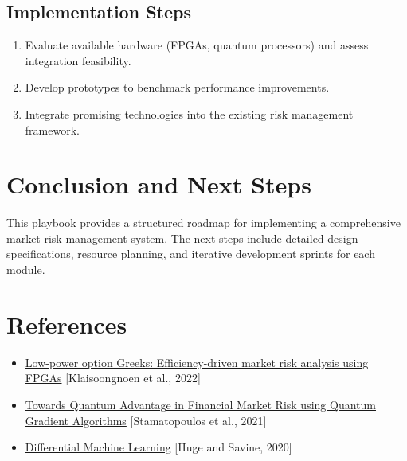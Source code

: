 \documentclass[11pt]{article}
\begin{document}
\subsection{Implementation Steps}
\begin{enumerate}
    \item Evaluate available hardware (FPGAs, quantum processors) and assess integration feasibility.
    \item Develop prototypes to benchmark performance improvements.
    \item Integrate promising technologies into the existing risk management framework.
\end{enumerate}

\section{Conclusion and Next Steps}
This playbook provides a structured roadmap for implementing a comprehensive market risk management system. The next steps include detailed design specifications, resource planning, and iterative development sprints for each module.

\section*{References}
\begin{itemize}
    \item \href{https://arxiv.org/abs/2206.03719}{Low-power option Greeks: Efficiency-driven market risk analysis using FPGAs} \hfill [Klaisoongnoen et al., 2022]
    \item \href{https://arxiv.org/abs/2111.12509}{Towards Quantum Advantage in Financial Market Risk using Quantum Gradient Algorithms} \hfill [Stamatopoulos et al., 2021]
    \item \href{https://arxiv.org/abs/2005.02347}{Differential Machine Learning} \hfill [Huge and Savine, 2020]
\end{itemize}
\end{document}
